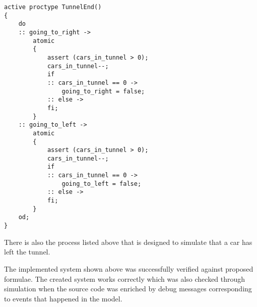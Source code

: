 \begin{lstlisting}[name=construction]
active proctype TunnelEnd()
{
	do
	:: going_to_right ->
		atomic
		{
			assert (cars_in_tunnel > 0);
			cars_in_tunnel--;
			if
			:: cars_in_tunnel == 0 ->
				going_to_right = false;
			:: else ->
			fi;
		}
	:: going_to_left ->
		atomic
		{
			assert (cars_in_tunnel > 0);
			cars_in_tunnel--;
			if
			:: cars_in_tunnel == 0 ->
				going_to_left = false;
			:: else ->
			fi;
		}
	od;
}
\end{lstlisting}

There is also the process listed above that is designed to simulate that a car has left the tunnel.

The implemented system shown above was successfully verified against proposed formulae. The created system works correctly which was also checked through simulation when the source code was enriched by debug messages corresponding to events that happened in the model.

